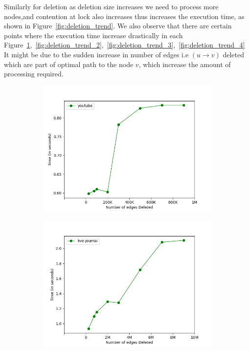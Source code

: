 \documentclass[a4paper]{article}
\begin{document}
Similarly for deletion as deletion size increases we need to process more nodes,and contention at lock also increases thus increases the execution time, as shown in Figure~\ref{fig:deletion_trend}. We also observe that there are certain points where the execution time increase drastically in each Figure~\ref{fig:deletion_trend_1},~\ref{fig:deletion_trend_2},~\ref{fig:deletion_trend_3},~\ref{fig:deletion_trend_4} It might be due to the sudden increase in number of edges i.e $(u \rightarrow v)$ deleted which are part of optimal path to the node $v$, which increase the amount of processing required.
\begin{figure}[H]
    \centering
    \begin{subfigure}[b]{0.48\textwidth}
         \centering
         \includegraphics[width=\textwidth]{img/del/d1.png}
         \caption{}
         \label{fig:deletion_trend_1}
    \end{subfigure}
    \hfill
    \begin{subfigure}[b]{0.48\textwidth}
         \centering
         \includegraphics[width=\textwidth]{img/del/d2.png}

\end{subfigure}
\end{figure}
\end{document}
